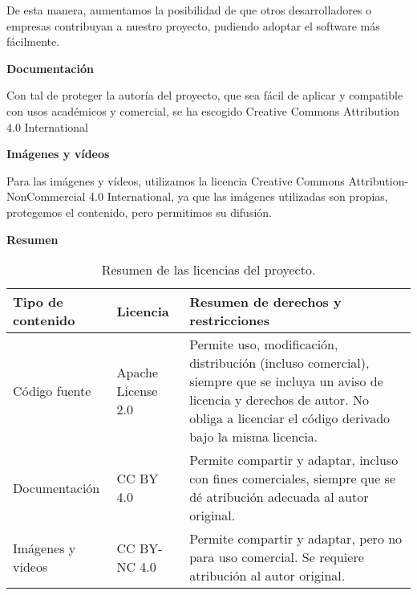 De esta manera, aumentamos la posibilidad de que otros desarrolladores o empresas contribuyan a nuestro proyecto, pudiendo
adoptar el software más fácilmente.


\textbf{Documentación}

Con tal de proteger la autoría del proyecto, que sea fácil de aplicar y compatible con usos académicos y comercial,
se ha escogido Creative Commons Attribution 4.0 International\cite{ccby4}

\textbf{Imágenes y vídeos}

Para las imágenes y vídeos, utilizamos la licencia Creative Commons Attribution-NonCommercial 4.0 International\cite{ccby_nc4},
ya que las imágenes utilizadas son propias, protegemos el contenido, pero permitimos su difusión.


\textbf{Resumen}

\begin{table}[H]
    \centering
    \begin{tabular}{|p{}|p{}|p{}|}
        \hline
        \textbf{Tipo de contenido} & \textbf{Licencia} & \textbf{Resumen de derechos y restricciones} \\
        \hline
        Código fuente & Apache License 2.0 & Permite uso, modificación, distribución (incluso comercial), siempre que se incluya un aviso de licencia y derechos de autor. No obliga a licenciar el código derivado bajo la misma licencia. \\
        \hline
        Documentación & CC BY 4.0 & Permite compartir y adaptar, incluso con fines comerciales, siempre que se dé atribución adecuada al autor original. \\
        \hline
        Imágenes y videos & CC BY-NC 4.0 & Permite compartir y adaptar, pero no para uso comercial. Se requiere atribución al autor original. \\
        \hline
    \end{tabular}
    \vspace{0.3em}
    \caption{Resumen de las licencias del proyecto.}
    \label{tab:licencias_contenido}
\end{table}
